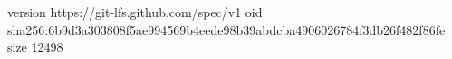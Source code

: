 version https://git-lfs.github.com/spec/v1
oid sha256:6b9d3a303808f5ae994569b4eede98b39abdcba4906026784f3db26f482f86fe
size 12498
